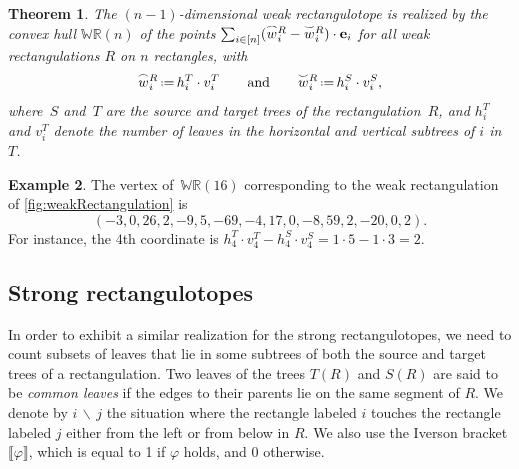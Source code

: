 \documentclass{amsart}
\newtheorem{theorem}{Theorem}%
\theoremstyle{definition}
\newtheorem{example}[theorem]{Example}
\newcommand{\eqdef}{\mbox{\,\raisebox{0.2ex}{\scriptsize\ensuremath{\mathrm:}}\ensuremath{=}\,}} %
\newcommand{\darkblue}{\color{darkblue}} %
\newcommand{\defn}[1]{\textsl{\darkblue #1}} %
\newcommand{\polytope}[1]{\mathds{#1}} %
\newcommand{\WRP}{\polytope{WR}} %
\newcommand{\loday}[1]{\smash{\overset{\frown}{#1}}}
\newcommand{\antiloday}[1]{\smash{\overset{\smile}{#1}}}
\begin{document}
\begin{theorem}
  The $(n-1)$-dimensional weak rectangulotope is realized by the convex hull $\WRP (n)$ of the points
  $\sum_{i\in [n]} (\loday{w}^R_i - \antiloday{w}^R_i)\cdot \mathbf{e}_i$ for all weak rectangulations $R$ on $n$ rectangles,
  with
  \[
    \loday{w}^R_i \eqdef h^T_i\cdot v^T_i
    \qquad\text{and}\qquad
    \antiloday{w}^R_i \eqdef h^S_i\cdot v^S_i,
  \]
  where~$S$ and~$T$ are the source and target trees of the rectangulation~$R$, and $h^T_i$ and $v^T_i$ denote the number of leaves in the horizontal and vertical subtrees of $i$ in~$T$.
\end{theorem}

\begin{example}
  The vertex of~$\WRP (16)$ corresponding to the weak rectangulation of \cref{fig:weakRectangulation} is
  \[
  (-3, 0, 26, 2, -9, 5, -69, -4, 17, 0, -8, 59, 2, -20, 0, 2).
  \]
  For instance, the $4$th coordinate is $h^T_4 \cdot v^T_4 - h^S_4 \cdot v^S_4 = 1 \cdot 5 - 1 \cdot 3 = 2$.
\end{example}

\subsection{Strong rectangulotopes}

In order to exhibit a similar realization for the strong rectangulotopes, we need to count subsets of leaves that lie in some subtrees of both the source and target trees of a rectangulation.
Two leaves of the trees $T(R)$ and $S(R)$ are said to be \defn{common leaves} if the edges to their parents lie on the same segment of $R$.
We denote by %
$i \, \backslash \, j$ the situation where the rectangle labeled $i$ touches the rectangle labeled $j$ either from the left or from below in $R$. %
We also use the Iverson bracket $\llbracket \varphi\rrbracket$, which is equal to 1 if $\varphi$ holds, and 0 otherwise.
\end{document}
